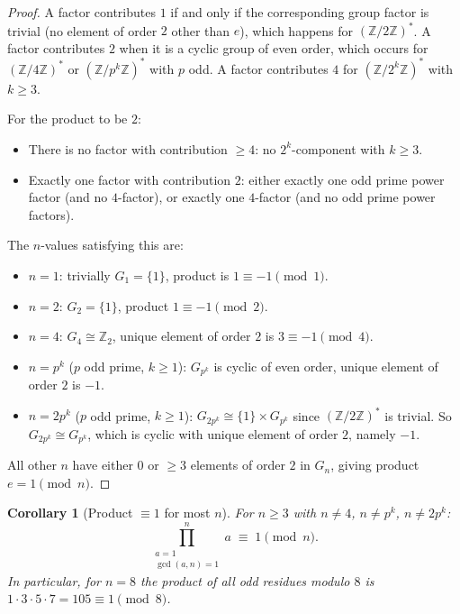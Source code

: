\documentclass[12pt,a4paper]{amsart}
\newtheorem{corollary}[theorem]{Corollary}
\theoremstyle{definition}
\newcommand{\Z}{\mathbb{Z}}
\begin{document}
\begin{proof}
  A factor contributes $1$ if and only if the corresponding group factor is trivial
  (no element of order $2$ other than $e$), which happens for $(\Z/2\Z)^*$.
  A factor contributes $2$ when it is a cyclic group of even order, which occurs
  for $(\Z/4\Z)^*$ or $(\Z/p^k\Z)^*$ with $p$ odd.
  A factor contributes $4$ for $(\Z/2^k\Z)^*$ with $k \geq 3$.

  For the product to be $2$:
  \begin{itemize}
    \item There is no factor with contribution $\geq 4$: no $2^k$-component
      with $k \geq 3$.
    \item Exactly one factor with contribution $2$: either exactly one odd prime
      power factor (and no $4$-factor), or exactly one $4$-factor (and no odd
      prime power factors).
  \end{itemize}

  The $n$-values satisfying this are:
  \begin{itemize}
    \item $n = 1$: trivially $G_1 = \{1\}$, product is $1 \equiv -1 \pmod 1$.
    \item $n = 2$: $G_2 = \{1\}$, product $1 \equiv -1 \pmod 2$.
    \item $n = 4$: $G_4 \cong \Z_2$, unique element of order $2$ is $3 \equiv -1 \pmod 4$. \checkmark
    \item $n = p^k$ ($p$ odd prime, $k \geq 1$): $G_{p^k}$ is cyclic of even order, unique element of order $2$ is $-1$. \checkmark
    \item $n = 2p^k$ ($p$ odd prime, $k \geq 1$): $G_{2p^k} \cong \{1\} \times G_{p^k}$
      since $(\Z/2\Z)^*$ is trivial.  So $G_{2p^k} \cong G_{p^k}$, which is cyclic
      with unique element of order $2$, namely $-1$. \checkmark
  \end{itemize}

  All other $n$ have either $0$ or $\geq 3$ elements of order $2$ in $G_n$,
  giving product $e = 1 \pmod n$.  \qedhere
\end{proof}

\begin{corollary}[Product $\equiv 1$ for most $n$]\label{cor:product_one}
  For $n \geq 3$ with $n \neq 4$, $n \neq p^k$, $n \neq 2p^k$:
  \[
    \prod_{\substack{a=1\\\gcd(a,n)=1}}^{n} a \;\equiv\; 1 \pmod n.
  \]
  In particular, for $n = 8$ the product of all odd residues modulo $8$
  is $1 \cdot 3 \cdot 5 \cdot 7 = 105 \equiv 1 \pmod 8$.
\end{corollary}
\end{document}
